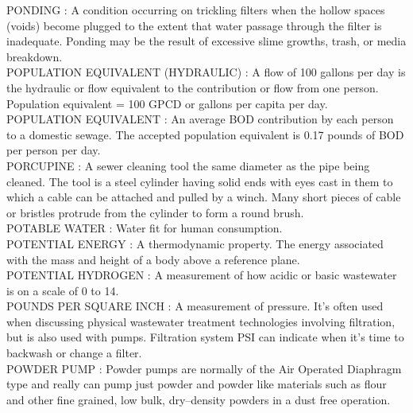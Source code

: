 \vspace{0.15cm}
PONDING :  A condition occurring on trickling filters when the hollow spaces (voids) become plugged to the extent that water passage through the filter is inadequate. Ponding may be the result of excessive slime growths, trash, or media breakdown.\\
\vspace{0.15cm}
POPULATION EQUIVALENT (HYDRAULIC) :  A flow of 100 gallons per day is the hydraulic or flow equivalent to the contribution or flow from one person. Population equivalent = 100 GPCD or gallons per capita per day. \\
\vspace{0.15cm}
POPULATION EQUIVALENT :  An average BOD contribution by each person to a domestic sewage. The accepted population equivalent is 0.17 pounds of BOD per person per day.\\
\vspace{0.15cm}
PORCUPINE :  A sewer cleaning tool the same diameter as the pipe being cleaned. The tool is a steel cylinder having solid ends with eyes cast in them to which a cable can be attached and pulled by a winch. Many short pieces of cable or bristles protrude from the cylinder to form a round brush. \\
\vspace{0.15cm}
POTABLE WATER :   Water fit for human consumption.\\
\vspace{0.15cm}
POTENTIAL ENERGY :   A thermodynamic property. The energy associated with the mass and height of a body above a reference plane.\\
\vspace{0.15cm}
POTENTIAL HYDROGEN :   A measurement of how acidic or basic wastewater is on a scale of 0 to 14.\\
\vspace{0.15cm}
POUNDS PER SQUARE INCH :   A measurement of pressure. It’s often used when discussing physical wastewater treatment technologies involving filtration, but is also used with pumps. Filtration system PSI can indicate when it’s time to backwash or change a filter.\\
\vspace{0.15cm}
POWDER PUMP :   Powder pumps are normally of the Air Operated Diaphragm type and really can pump just powder and powder like materials such as flour and other fine grained, low bulk, dry–density powders in a dust free operation.\\
\vspace{0.15cm}
